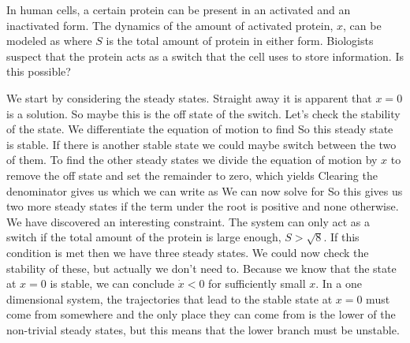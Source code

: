 In human cells, a certain protein can be present in an activated and an inactivated form.  The dynamics of the amount of activated protein, $x$, can be modeled as 
where $S$ is the total amount of protein in either form.
Biologists suspect that the protein acts as a switch that the cell uses to store information. Is this possible? 

\solution 
We start by considering the steady states. Straight away it is apparent that 
$x=0$ is a solution. So maybe this is the off state of the switch.
Let's check the stability of the state. We differentiate the equation of motion to find 
So this steady state is stable.  If there is another stable state we could maybe switch between the two of them. To find the other steady states we divide the equation of motion by $x$ to remove the off state and set the remainder to zero, which yields 
Clearing the denominator gives us 
which we can write as
We can now solve for 
So this gives us two more steady states if the term under the root is positive and none otherwise.  We have discovered an interesting constraint. The system can only act as a switch if the total amount of the protein is large enough, $S>\sqrt{8}$. If this condition is met then we have three steady states. We could now check the stability of these, but actually we don't need to. Because we know that the state at $x=0$ is stable, we can conclude $\dot{x}<0$ for sufficiently small $x$. In a one dimensional system, the trajectories that lead to the stable state at $x=0$ must come from somewhere and the only place they can come from is the lower of the non-trivial steady states, but this means that the lower branch must be unstable. 

